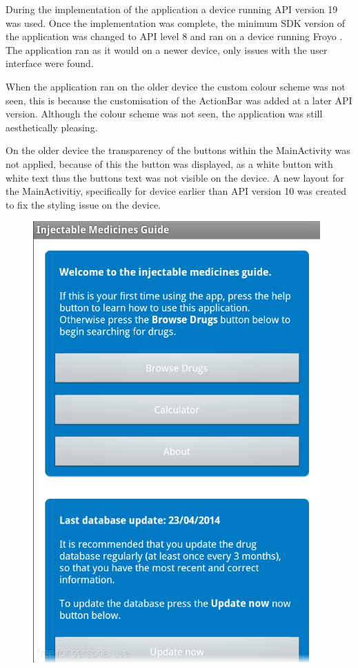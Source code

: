 During the implementation of the application a device running API version 19 was used. Once the implementation was complete, the minimum SDK version of the application was changed to API level 8 and ran on a device running Froyo \cite{froyo}. The application ran as it would on a newer device, only issues with the user interface were found.

When the application ran on the older device the custom colour scheme was not seen, this is because the customisation of the ActionBar was added at a later API version. Although the colour scheme was not seen, the application was still aesthetically pleasing.

On the older device the transparency of the buttons within the MainActivity was not applied, because of this the button was displayed, as a white button with white text thus the buttons text was not visible on the device. A new layout for the MainActivitiy, specifically for device earlier than API version 10 was created to fix the styling issue on the device. 

\begin{figure}[H]
  \centering
  \includegraphics[width=11cm]{Images/screenshots/mainFailed.png}
\end{figure}

